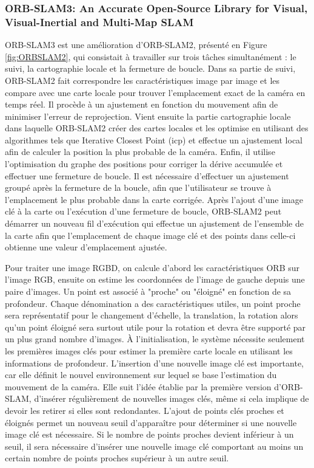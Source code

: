 \documentclass[11pt]{article}
\begin{document}
        \subsubsection{ORB-SLAM3: An Accurate Open-Source Library for Visual, Visual-Inertial and Multi-Map SLAM}
          ORB-SLAM3 \cite{camposORBSLAM3AccurateOpenSource2021} est une amélioration d'ORB-SLAM2, présenté 
          en Figure \ref{fig:ORBSLAM2}, qui consistait à travailler sur trois tâches simultanément : 
          le suivi, la cartographie locale et la fermeture de boucle. Dans sa partie de suivi, ORB-SLAM2 fait correspondre les caractéristiques image 
          par image et les compare avec une carte locale pour trouver l'emplacement exact de la caméra en temps réel. Il procède à un ajustement 
          en fonction du mouvement afin de minimiser l'erreur de reprojection. Vient ensuite la partie cartographie locale 
          dans laquelle ORB-SLAM2 
          créer des cartes locales et les optimise en utilisant des algorithmes tels que Iterative Closest Point (\acrshort{icp}) et effectue un ajustement 
          local afin de calculer la position la plus probable de la caméra. Enfin, il utilise l'optimisation du graphe des positions 
          pour corriger la dérive accumulée et effectuer une fermeture de boucle. Il est nécessaire d'effectuer un ajustement groupé
          après la fermeture de la boucle, afin que l'utilisateur se trouve à l'emplacement le plus probable dans la carte corrigée. 
          Après l'ajout d'une image clé à la carte ou l'exécution d'une fermeture de boucle, 
          ORB-SLAM2 peut démarrer un nouveau fil d'exécution qui effectue un ajustement de l'ensemble de la carte afin que 
          l'emplacement de chaque image clé et des points dans celle-ci obtienne une valeur d'emplacement ajustée.

          Pour traiter une image RGBD, on calcule d'abord les caractéristiques ORB sur l'image RGB, ensuite on estime les coordonnées de l'image de 
          gauche depuis une paire d'images. Un point est associé à "proche" ou "éloigné" en fonction de sa profondeur. Chaque dénomination a des
          caractéristiques utiles, un point proche sera représentatif pour le changement d'échelle, la translation, la rotation alors qu'un point éloigné
          sera surtout utile pour la rotation et devra être supporté par un plus grand nombre d'images.
          À l'initialisation, le système nécessite seulement les premières images clés pour estimer la première carte locale en utilisant les informations
          de profondeur. 
          L'insertion d'une nouvelle image clé est importante, car elle définit le nouvel environnement sur lequel se base l'estimation du mouvement 
          de la caméra. Elle suit l'idée établie par la première version d'ORB-SLAM, d'insérer régulièrement de nouvelles images clés, 
          même si cela implique de devoir les retirer si elles sont redondantes. L'ajout de points clés proches et éloignés permet un nouveau seuil 
          d'apparaître pour déterminer si une nouvelle image clé est nécessaire. 
          Si le nombre de points proches devient inférieur à un seuil, il sera nécessaire d'insérer une nouvelle image clé comportant au moins un certain
          nombre de points proches supérieur à un autre seuil.
\end{document}

